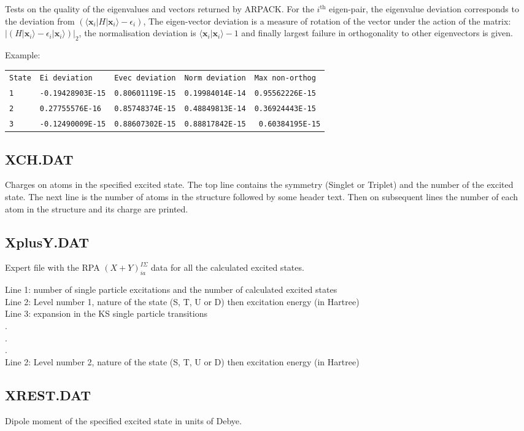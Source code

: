 Tests on the quality of the eigenvalues and vectors returned by ARPACK. For the
$i^\mathrm{th}$ eigen-pair, the eigenvalue deviation corresponds to the
deviation from $\left( \langle \mathbf{x}_i | H | \mathbf{x}_i\rangle -
\epsilon_i \right)$, The eigen-vector deviation is a measure of rotation of the
vector under the action of the matrix: $\left| \left( H | \mathbf{x}_i\rangle -
\epsilon_i | \mathbf{x}_i\rangle \right) \right|_2$, the normalisation deviation
is $\langle \mathbf{x}_i | \mathbf{x}_i\rangle - 1$ and finally largest failure
in orthogonality to other eigenvectors is given.

Example:\\
\begin{tabular}{lllll}
{\tt State} & {\tt Ei deviation} & {\tt Evec deviation} & {\tt Norm deviation} &
{\tt Max non-orthog}\\ {\tt 1} & {\tt -0.19428903E-15} & {\tt 0.80601119E-15} &
{\tt 0.19984014E-14} & {\tt 0.95562226E-15}\\ {\tt 2} & {\tt 0.27755576E-16} &
{\tt 0.85748374E-15} & {\tt 0.48849813E-14} & {\tt 0.36924443E-15}\\ {\tt 3} &
{\tt -0.12490009E-15} & {\tt 0.88607302E-15} & {\tt 0.88817842E-15} & {\tt
  0.60384195E-15}\\
\end{tabular}

\subsection{XCH.DAT}

Charges on atoms in the specified excited state. The top line contains the
symmetry (Singlet or Triplet) and the number of the excited state. The next line
is the number of atoms in the structure followed by some header text. Then on
subsequent lines the number of each atom in the structure and its charge are
printed.

\subsection{XplusY.DAT}

Expert file with the RPA  $(X+Y)^{I\Sigma}_{ia}$ data for all the calculated
excited states.

Line 1: number of single particle excitations and the number of calculated
excited states\\
Line 2: Level number 1, nature of the state (S, T, U or D) then excitation
energy (in Hartree)\\
Line 3: expansion in the KS single particle transitions\\
.\\
.\\
.\\
Line 2: Level number 2, nature of the state (S, T, U or D) then excitation
energy (in Hartree)\\

\subsection{XREST.DAT}

Dipole moment of the specified excited state in units of Debye.

